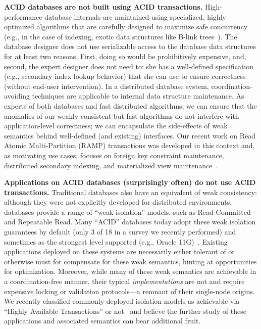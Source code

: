 \begin{myitemize}
\item \textbf{ACID databases are not built using ACID transactions.} High-performance database internals are maintained using specialized, highly optimized algorithms that are carefully designed to maximize safe concurrency~\cite{gray-book} (e.g., in the case of indexing, exotic data structures like B-link trees~\cite{blink-tree}). The database designer does not use serializable access to the database data structures for at least two reasons. First, doing so would be prohibitively expensive, and, second, the expert designer does not need to: she has a well-defined specification (e.g., secondary index lookup behavior) that she can use to ensure correctness (without end-user intervention). In a distributed database system, coordination-avoiding techniques are applicable to internal data structure maintenance. As experts of both databases and fast distributed algorithms, we can ensure that the anomalies of our weakly consistent but fast algorithms do not interfere with application-level correctness; we can encapsulate the side-effects of weak semantics behind well-defined (and existing) interfaces. Our recent work on Read Atomic Multi-Partition (RAMP) transactions was developed in this context and, as motivating use cases, focuses on foreign key constraint maintenance, distributed secondary indexing, and materialized view maintenance~\cite{ramp-txns}.

\item \textbf{Applications on ACID databases (surprisingly often) do not use ACID transactions.} Traditional databases also have an equivalent of weak consistency: although they were not explicitly developed for distributed environments, databases provide a range of ``weak isolation'' models, such as Read Committed and Repeatable Read. Many ``ACID'' databases today adopt these weak isolation guarantees by default (only 3 of 18 in a survey we recently performed) and sometimes as the strongest level supported (e.g., Oracle 11G)~\cite{hat-vldb}. Existing applications deployed on these systems are necessarily either tolerant of or otherwise must for compensate for these weak semantics, hinting at opportunities for optimization. Moreover, while many of these weak semantics are achievable in a coordination-free manner, their typical \textit{implementations} are not and require expensive locking or validation protocols---a remnant of their single-node origins. We recently classified commonly-deployed isolation models as achievable via ``Highly Available Transactions'' or not~\cite{hat-vldb} and believe the further study of these applications and associated semantics can bear additional fruit.


\end{myitemize}

